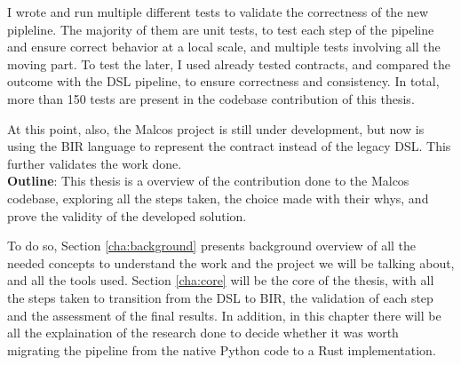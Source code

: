 I wrote and run multiple different tests to validate the correctness of the new
pipleline. The majority of them are unit tests, to test each step of the
pipeline and ensure correct behavior at a local scale, and multiple tests involving
all the moving part. To test the later, I used already tested contracts, and
compared the outcome with the DSL pipeline, to ensure correctness and consistency.
In total, more than 150 tests are present in the codebase contribution of this thesis.

At this point, also, the Malcos project is still under development, but now is
using the BIR language to represent the contract instead of the legacy DSL. This
further validates the work done. \\

\textbf{Outline}: This thesis is a overview of the contribution done to the Malcos
codebase, exploring all the steps taken, the choice made with their whys, and
prove the validity of the developed solution.

To do so, Section \ref{cha:background} presents background overview of all the needed
concepts to understand the work and the project we will be talking about, and
all the tools used. Section \ref{cha:core} will be the core of the thesis, with
all the steps taken to transition from the DSL to BIR, the validation of each step
and the assessment of the final results. In addition, in this chapter there will
be all the explaination of the research done to decide whether it was worth migrating
the pipeline from the native Python code to a Rust implementation.